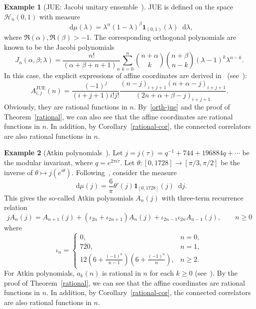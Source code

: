 \documentclass[a4paper]{article}
\theoremstyle{plain}
\theoremstyle{definition}
\newtheorem{example}{Example}
\newcommand{\dif}{\mathop{}\!\mathrm{d}}
\begin{document}
\begin{example}[JUE: Jacobi unitary ensemble~\cite{Jacobi,Mehta,Szego,JUE,corJUE}] \label{jue}
	JUE is defined on the space $\mathcal{H}_n(0,1)$ with measure
	\begin{equation}
		\dif\mu(\lambda)=\lambda^\alpha(1-\lambda)^\beta\mathbf{1}_{(0,1)}(\lambda)\dif\lambda,
	\end{equation}
	where $\Re(\alpha),\Re(\beta)>-1$. The corresponding orthogonal polynomials are known to be the Jacobi polynomials
	\begin{equation} \label{orth-jue}
		J_n(\alpha,\beta;\lambda)=\frac{n!}{(\alpha+\beta+n+1)_n}\sum_{k=0}^n\binom{n+\alpha}{k}\binom{n+\beta}{n-k}(\lambda-1)^k\lambda^{n-k}.
	\end{equation}
	In this case, the explicit expressions of affine coordinates are derived in~\cite{JUE,corJUE} (see~\cite{HE,Emergent,BY}):
	\begin{equation}
		A_{i,j}^\mathrm{JUE}(n)=\frac{(-1)^j}{(i+j+1)i!j!}\frac{(n-j)_{i+j+1}(n+\alpha-j)_{i+j+1}}{(2n+\alpha+\beta-j)_{i+j+1}}.
	\end{equation}
	Obviously, they are rational functions in $n$. By~\eqref{orth-jue} and the proof of Theorem~\ref{rational}, we can also see that the affine coordinates are rational functions in $n$. In addition, by Corollary~\ref{rational-cor}, the connected correlators are also rational functions in $n$.
\end{example}

\begin{example}[Atkin polynomials~\cite{KZ}] \label{atkin}
	Let $j=j(\tau)=q^{-1}+744+196884q+\cdots$ be the modular invariant, where $q=e^{2\pi i\tau}$. Let $\theta:[0,1728]\to[\pi/3,\pi/2]$ be the inverse of $\theta\mapsto j(e^{i\theta})$. Following~\cite{KZ}, consider the measure
	\begin{equation}
		\dif\mu(j)=\frac{6}{\pi}\theta'(j)\mathbf{1}_{[0,1728]}(j)\dif j.
	\end{equation}
	This gives the so-called Atkin polynomials $A_n(j)$ with three-term recurrence relation
	\begin{equation}
		jA_n(j)=A_{n+1}(j)+(\iota_{2n}+\iota_{2n+1})A_n(j)+\iota_{2n-1}\iota_{2n}A_{n-1}(j),\qquad n\ge0
	\end{equation} where
	\begin{equation}
		\iota_n=\begin{cases}
			0,&n=0,\\
			720,&n=1,\\
			12\left(6+\frac{(-1)^n}{n-1}\right)\left(6+\frac{(-1)^n}{n}\right),&n\ge2.
		\end{cases}
	\end{equation}
	For Atkin polynomials, $a_k(n)$ is rational in $n$ for each $k\ge0$ (see~\cite{KZ}). By the proof of Theorem~\ref{rational}, we can see that the affine coordinates are rational functions in $n$. In addition, by Corollary~\ref{rational-cor}, the connected correlators are also rational functions in $n$.
\end{example}
\end{document}
